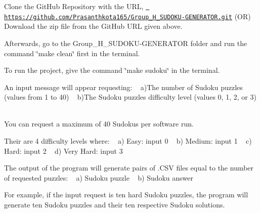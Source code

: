 \begin{DoxyEnumerate}
\item Clone the Git\+Hub Repository with the U\+RL, \href{https://github.com/Prasanthkota165/Group_H_SUDOKU-GENERATOR.git}{\texttt{ https\+://github.\+com/\+Prasanthkota165/\+Group\+\_\+\+H\+\_\+\+S\+U\+D\+O\+K\+U-\/\+G\+E\+N\+E\+R\+A\+T\+O\+R.\+git}} (OR) Download the zip file from the Git\+Hub U\+RL given above.
\item Afterwards, go to the Group\+\_\+\+H\+\_\+\+S\+U\+D\+O\+K\+U-\/\+G\+E\+N\+E\+R\+A\+T\+OR folder and run the command \char`\"{}make clean\char`\"{} first in the terminal.
\item To run the project, give the command \char`\"{}make sudoku\char`\"{} in the terminal.
\item An input message will appear requesting\+: ~\newline
 a)The number of Sudoku puzzles (values from 1 to 40) ~\newline
 b)The Sudoku puzzle\textquotesingle{}s difficulty level (values 0, 1, 2, or 3) ~\newline

\item You can request a maximum of 40 Sudokus per software run.
\item Their are 4 difficulty levels where\+: ~\newline
 a) Easy\+: input \textquotesingle{}0\textquotesingle{} ~\newline
 b) Medium\+: input \textquotesingle{}1\textquotesingle{} ~\newline
 c) Hard\+: input \textquotesingle{}2\textquotesingle{} ~\newline
 d) Very Hard\+: input \textquotesingle{}3\textquotesingle{}
\item The output of the program will generate pairs of .C\+SV files equal to the number of requested puzzles\+: ~\newline
 a) Sudoku puzzle ~\newline
 b) Sudoku answer ~\newline


For example, if the input request is ten hard Sudoku puzzles, the program will generate ten Sudoku puzzles and their ten respective Sudoku solutions. 
\end{DoxyEnumerate}